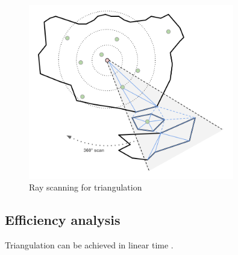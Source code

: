\documentclass[a4paper,11pt]{article}
\begin{document}
\begin{figure}[h!]
  \centering
  \includegraphics[width=0.8\textwidth]{scan.png}
  \caption{Ray scanning for triangulation}
  \label{scan}
\end{figure}

\subsection{Efficiency analysis}
Triangulation can be achieved in linear time \cite{chazelle}.

\nocite{*}


\end{document}
